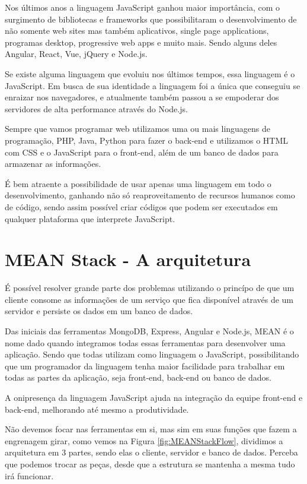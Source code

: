 \documentclass[
    article,            %
    11pt,               %
    oneside,            %
    a4paper,            %
    english,            %
    brazil,             %
    sumario=tradicional
    ]{abntex2}
\begin{document}
Nos últimos anos a linguagem JavaScript ganhou maior importância, com o
surgimento de bibliotecas e frameworks que possibilitaram o desenvolvimento de não
somente web sites mas também aplicativos, single page applications, programas desktop,
progressive web apps e muito mais. Sendo alguns deles Angular, React, Vue, jQuery e
Node.js.

Se existe alguma linguagem que evoluiu nos últimos tempos, essa linguagem é o JavaScript. Em busca de  sua identidade a linguagem foi a única que conseguiu se enraizar nos navegadores, e atualmente também passou a se empoderar dos servidores de alta performance através do Node.js.

Sempre que vamos programar web utilizamos uma ou mais linguagens de programação, PHP, Java, Python para fazer o back-end e utilizamos o HTML com CSS e o JavaScript para o front-end, além de um banco de dados para armazenar as informações.

É bem atraente a possibilidade de usar apenas uma linguagem em todo o desenvolvimento, ganhando não só reaproveitamento de recursos humanos como de código, sendo assim possível criar códigos que podem ser executados em qualquer plataforma que interprete JavaScript.

\section{MEAN Stack - A arquitetura}

É possível resolver grande parte dos problemas utilizando o princípo de que um cliente consome as informações de um serviço que fica disponível através de um servidor e persiste os dados em um banco de dados.

Das iniciais das ferramentas MongoDB, Express, Angular e Node.js, MEAN é o nome dado quando integramos todas essas ferramentas para desenvolver uma aplicação. Sendo que todas utilizam como linguagem o JavaScript, possibilitando que um programador da linguagem tenha maior facilidade para trabalhar em todas as partes da aplicação, seja front-end, back-end ou banco de dados.

A onipresença da linguagem JavaScript ajuda na integração da equipe front-end e back-end, melhorando até mesmo a produtividade.

Não devemos focar nas ferramentas em si, mas sim em suas funções que fazem a engrenagem girar, como vemos na Figura \ref{fig:MEANStackFlow}, dividimos a arquitetura em 3 partes, sendo elas o cliente, servidor e banco de dados. Perceba que podemos trocar as peças, desde que a estrutura se mantenha a mesma tudo irá funcionar.
\end{document}
